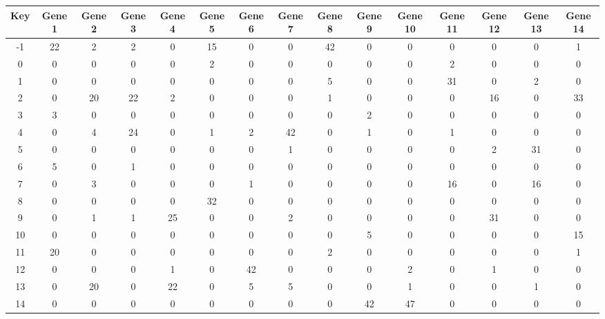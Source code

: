 \begin{tabular}{|c|c|c|c|c|c|c|c|c|c|c|c|c|c|c|}
\hline
Key & Gene 1 & Gene 2 & Gene 3 & Gene 4 & Gene 5 & Gene 6 & Gene 7 & Gene 8 & Gene 9 & Gene 10 & Gene 11 & Gene 12 & Gene 13 & Gene 14 \\
\hline
-1 & 22 & 2 & 2 & 0 & 15 & 0 & 0 & 42 & 0 & 0 & 0 & 0 & 0 & 1 \\
0 & 0 & 0 & 0 & 0 & 2 & 0 & 0 & 0 & 0 & 0 & 2 & 0 & 0 & 0 \\
1 & 0 & 0 & 0 & 0 & 0 & 0 & 0 & 5 & 0 & 0 & 31 & 0 & 2 & 0 \\
2 & 0 & 20 & 22 & 2 & 0 & 0 & 0 & 1 & 0 & 0 & 0 & 16 & 0 & 33 \\
3 & 3 & 0 & 0 & 0 & 0 & 0 & 0 & 0 & 2 & 0 & 0 & 0 & 0 & 0 \\
4 & 0 & 4 & 24 & 0 & 1 & 2 & 42 & 0 & 1 & 0 & 1 & 0 & 0 & 0 \\
5 & 0 & 0 & 0 & 0 & 0 & 0 & 1 & 0 & 0 & 0 & 0 & 2 & 31 & 0 \\
6 & 5 & 0 & 1 & 0 & 0 & 0 & 0 & 0 & 0 & 0 & 0 & 0 & 0 & 0 \\
7 & 0 & 3 & 0 & 0 & 0 & 1 & 0 & 0 & 0 & 0 & 16 & 0 & 16 & 0 \\
8 & 0 & 0 & 0 & 0 & 32 & 0 & 0 & 0 & 0 & 0 & 0 & 0 & 0 & 0 \\
9 & 0 & 1 & 1 & 25 & 0 & 0 & 2 & 0 & 0 & 0 & 0 & 31 & 0 & 0 \\
10 & 0 & 0 & 0 & 0 & 0 & 0 & 0 & 0 & 5 & 0 & 0 & 0 & 0 & 15 \\
11 & 20 & 0 & 0 & 0 & 0 & 0 & 0 & 2 & 0 & 0 & 0 & 0 & 0 & 1 \\
12 & 0 & 0 & 0 & 1 & 0 & 42 & 0 & 0 & 0 & 2 & 0 & 1 & 0 & 0 \\
13 & 0 & 20 & 0 & 22 & 0 & 5 & 5 & 0 & 0 & 1 & 0 & 0 & 1 & 0 \\
14 & 0 & 0 & 0 & 0 & 0 & 0 & 0 & 0 & 42 & 47 & 0 & 0 & 0 & 0 \\
\hline
\end{tabular}